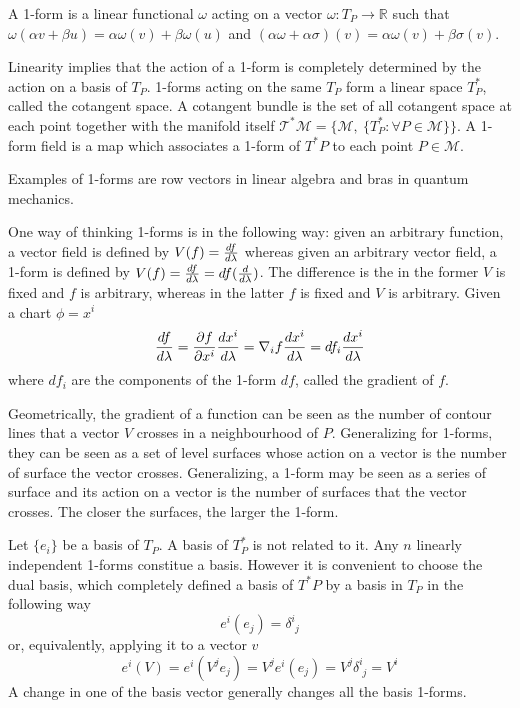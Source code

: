     \begin{definition}[1-form]
        A 1-form is a linear functional $\omega$ acting on a vector $\omega \colon T_P \rightarrow \mathbb R$ such that $\omega(\alpha v + \beta u) = \alpha \omega(v) + \beta \omega(u)$ and $(\alpha \omega + \alpha \sigma)(v) = \alpha \omega(v) + \beta \sigma(v)$. 
    \end{definition}
    Linearity implies that the action of a 1-form is completely determined by the action on a basis of $T_P$. 1-forms acting on the same $T_P$ form a linear space $T^*_P$, called the cotangent space. A cotangent bundle is the set of all cotangent space at each point together with the manifold itself $\mathcal T^* \mathcal M = \{\mathcal M, ~\{T^*_P \colon \forall P \in \mathcal M \}\}$. A 1-form field is a map which associates a 1-form of $T^*P$ to each point $P \in \mathcal M$. 

    Examples of 1-forms are row vectors in linear algebra and bras in quantum mechanics.

    One way of thinking 1-forms is in the following way: given an arbitrary function, a vector field is defined by $V(f) = \frac{df}{d\lambda}$ whereas given an arbitrary vector field, a 1-form is defined by $V(f) = \frac{df}{d\lambda} = df (\frac{d}{d\lambda})$. The difference is the in the former $V$ is fixed and $f$ is arbitrary, whereas in the latter $f$ is fixed and $V$ is arbitrary. Given a chart $\phi = x^i$
    \begin{equation*}
        \frac{df}{d\lambda} = \frac{\partial f}{\partial x^i} \frac{dx^i}{d\lambda} = \nabla_i f \frac{dx^i}{d\lambda} = df_i \frac{dx^i}{d\lambda}
    \end{equation*}
    where $df_i$ are the components of the 1-form $df$, called the gradient of $f$.
    
    Geometrically, the gradient of a function can be seen as the number of contour lines that a vector $V$ crosses in a neighbourhood of $P$. Generalizing for 1-forms, they can be seen as a set of level surfaces whose action on a vector is the number of surface the vector crosses. Generalizing, a 1-form may be seen as a series of surface and its action on a vector is the number of surfaces that the vector crosses. The closer the surfaces, the larger the 1-form.

    Let $\{e_i\}$ be a basis of $T_P$. A basis of $T^*_P$ is not related to it. Any $n$ linearly independent 1-forms constitue a basis. However it is convenient to choose the dual basis, which completely defined a basis of $T^*P$ by a basis in $T_P$ in the following way
    \begin{equation}\label{dual}
        e^i(e_j) = \delta^i_{\phantom i j}
    \end{equation}
    or, equivalently, applying it to a vector $v$
    \begin{equation*}
        e^i(V) = e^i(V^j e_j) = V^j e^i(e_j) = V^j \delta^i_{\phantom i j} = V^i
    \end{equation*}
    A change in one of the basis vector generally changes all the basis 1-forms.

